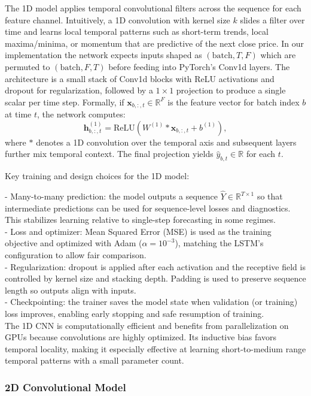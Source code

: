 \documentclass[sigconf]{acmart}
\begin{document}
The 1D model applies temporal convolutional filters across the sequence for each feature channel. Intuitively, a 1D convolution with kernel size $k$ slides a filter over time and learns local temporal patterns such as short-term trends, local maxima/minima, or momentum that are predictive of the next close price. In our implementation the network expects inputs shaped as $(\text{batch}, T, F)$ which are permuted to $(\text{batch}, F, T)$ before feeding into PyTorch's Conv1d layers. The architecture is a small stack of Conv1d blocks with ReLU activations and dropout for regularization, followed by a $1\times1$ projection to produce a single scalar per time step. Formally, if $\mathbf{x}_{b,:,t}\in\mathbb{R}^F$ is the feature vector for batch index $b$ at time $t$, the network computes:
$$
\mathbf{h}_{b,:,t}^{(1)} = \text{ReLU}(W^{(1)} * \mathbf{x}_{b,:,t} + b^{(1)}),
$$
where $*$ denotes a 1D convolution over the temporal axis and subsequent layers further mix temporal context. The final projection yields $\hat{y}_{b,t}\in\mathbb{R}$ for each $t$.

Key training and design choices for the 1D model:

- Many-to-many prediction: the model outputs a sequence $\hat{Y}\in\mathbb{R}^{T\times 1}$ so that intermediate predictions can be used for sequence-level losses and diagnostics. This stabilizes learning relative to single-step forecasting in some regimes. \\
- Loss and optimizer: Mean Squared Error (MSE) is used as the training objective and optimized with Adam ($\alpha=10^{-3}$), matching the LSTM's configuration to allow fair comparison. \\
- Regularization: dropout is applied after each activation and the receptive field is controlled by kernel size and stacking depth. Padding is used to preserve sequence length so outputs align with inputs. \\
- Checkpointing: the trainer saves the model state when validation (or training) loss improves, enabling early stopping and safe resumption of training.
\\
The 1D CNN is computationally efficient and benefits from parallelization on GPUs because convolutions are highly optimized. Its inductive bias favors temporal locality, making it especially effective at learning short-to-medium range temporal patterns with a small parameter count.

\subsubsection{2D Convolutional Model}
\end{document}
